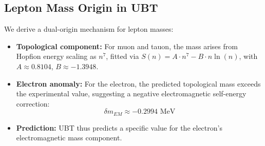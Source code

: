 

\subsection*{Lepton Mass Origin in UBT}
We derive a dual-origin mechanism for lepton masses:
\begin{itemize}
    \item \textbf{Topological component:} For muon and tauon, the mass arises from Hopfion energy scaling as \(n^7\), fitted via \( S(n) = A \cdot n^7 - B \cdot n \ln(n) \), with \( A \approx 0.8104 \), \( B \approx -1.3948 \).
    \item \textbf{Electron anomaly:} For the electron, the predicted topological mass exceeds the experimental value, suggesting a negative electromagnetic self-energy correction:
    \[
        \delta m_{EM} \approx -0.2994 \text{ MeV}
    \]
    \item \textbf{Prediction:} UBT thus predicts a specific value for the electron's electromagnetic mass component.
\end{itemize}
